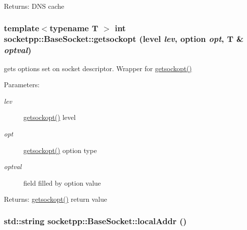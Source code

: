 \begin{Desc}
\item[Returns:]DNS cache \end{Desc}
\hypertarget{classsocketpp_1_1BaseSocket_c845c3a037f0f400fd50dfb58706b6e4}{
\subsubsection[{getsockopt}]{\setlength{\rightskip}{0pt plus 5cm}template$<$typename T $>$ int socketpp::BaseSocket::getsockopt ({\bf level} {\em lev}, \/  {\bf option} {\em opt}, \/  T \& {\em optval})}}
\label{classsocketpp_1_1BaseSocket_c845c3a037f0f400fd50dfb58706b6e4}


gets options set on socket descriptor. Wrapper for \hyperlink{classsocketpp_1_1BaseSocket_c845c3a037f0f400fd50dfb58706b6e4}{getsockopt()} 

\begin{Desc}
\item[Parameters:]
\begin{description}
\item[{\em lev}]\hyperlink{classsocketpp_1_1BaseSocket_c845c3a037f0f400fd50dfb58706b6e4}{getsockopt()} level \item[{\em opt}]\hyperlink{classsocketpp_1_1BaseSocket_c845c3a037f0f400fd50dfb58706b6e4}{getsockopt()} option type \item[{\em optval}]field filled by option value \end{description}
\end{Desc}
\begin{Desc}
\item[Returns:]\hyperlink{classsocketpp_1_1BaseSocket_c845c3a037f0f400fd50dfb58706b6e4}{getsockopt()} return value \end{Desc}
\hypertarget{classsocketpp_1_1BaseSocket_0caed2e7d3f0e4db7d4c1aa3aba52caf}{
\subsubsection[{localAddr}]{\setlength{\rightskip}{0pt plus 5cm}std::string socketpp::BaseSocket::localAddr ()}}
\label{classsocketpp_1_1BaseSocket_0caed2e7d3f0e4db7d4c1aa3aba52caf}


